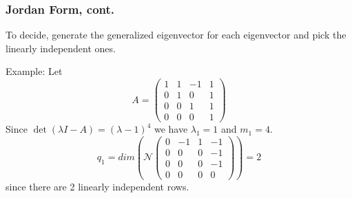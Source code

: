 \documentclass{beamer}
\begin{document}
\begin{frame}\frametitle{Jordan Form, cont.}
	To decide, generate the generalized eigenvector for each eigenvector
	and pick the linearly independent ones.
	
	Example:  Let
	\[ 
		A = \begin{pmatrix}
	    		1 & 1 & -1 & 1\\
	    		0 & 1 & 0 & 1\\
	    		0 & 0 & 1 & 1\\
	    		0 & 0 & 0 & 1
	  		\end{pmatrix}
	\]
	Since $\det(\lambda I - A) = (\lambda-1)^4$ we have $\lambda_1 = 1$
	and $m_1 = 4$.
	\[ 
		q_1 = dim(\mathcal{N}
				\begin{pmatrix}
	    			0 & -1 & 1 & -1\\
	    			0 & 0 & 0 & -1\\
	    			0 & 0 & 0 & -1\\
	    			0 & 0 & 0 & 0
	  			\end{pmatrix}
	  		   ) 
	  		= 2
	\] 
	since there are 2 linearly independent rows.
	
\end{frame}
\end{document}
